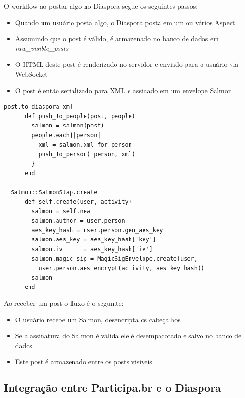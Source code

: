 \documentclass[12pt]{article}
\begin{document}
O workflow ao postar algo no Diaspora segue os seguintes passos:

\begin{itemize}
  \item Quando um usuário posta algo, o Diaspora posta em um ou vários Aspect
  \item Assumindo que o post é válido, é armazenado no banco de dados em {\it raw\_visible\_posts}
  \item O HTML deste post é renderizado no servidor e enviado para o usuário via WebSocket\cite{websocket}
  \item O post é então serializado para XML e assinado em um envelope Salmon
\end{itemize}

\begin{framed}
\begin{lstlisting}[caption=Exemplo envio de mensagem e como o Diaspora serializa em XML]
  post.to_diaspora_xml
      def push_to_people(post, people)
        salmon = salmon(post)
        people.each{|person|
          xml = salmon.xml_for person
          push_to_person( person, xml)
        }
      end
  
  Salmon::SalmonSlap.create
      def self.create(user, activity)
        salmon = self.new
        salmon.author = user.person
        aes_key_hash = user.person.gen_aes_key
        salmon.aes_key = aes_key_hash['key']
        salmon.iv      = aes_key_hash['iv']
        salmon.magic_sig = MagicSigEnvelope.create(user,
          user.person.aes_encrypt(activity, aes_key_hash))
        salmon
      end
\end{lstlisting}
\end{framed}

Ao receber um post o fluxo é o seguinte:

\begin{itemize}
  \item O usuário recebe um Salmon, desencripta os cabeçalhos
  \item Se a assinatura do Salmon é válida ele é desempacotado e salvo no banco de dados
  \item Este post é armazenado entre os posts visiveis
\end{itemize}

\subsection{Integração entre Participa.br e o Diaspora}

\end{document}
